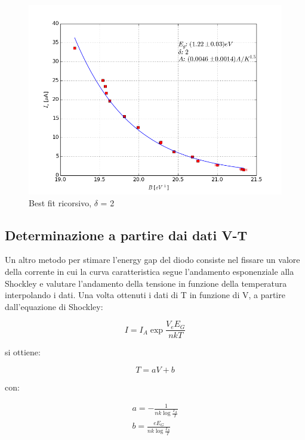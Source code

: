 \documentclass[a4paper]{article}
\begin{document}
\begin{itemize}
\begin{figure}[!h]
\centering
        \includegraphics[scale=.5]{energygap_first_recursive2}
        \caption{Best fit ricorsivo, $\delta$ = 2}
        \label{fig:mouse}
\end{figure}

\subsection{Determinazione a partire dai dati V-T}

Un altro metodo per stimare l'energy gap del diodo consiste nel fissare un valore della corrente in cui la curva caratteristica segue l'andamento esponenziale alla Shockley e valutare l'andamento della tensione in funzione della temperatura interpolando i dati. Una volta ottenuti i dati di T in funzione di V, a partire dall'equazione di Shockley:

\begin{equation}
I = I_A \exp \frac{V_eE_G}{nkT}
\end{equation}

si ottiene:

\begin{equation}
\label{eqn:lin}
T = aV +b
\end{equation}

con:

\begin{gather}
a = -\frac{1}{nk \log \frac{I_A}{I}} \\
b = \frac{eE_G}{nk \log \frac{I_A}{I}}
\end{gather}


\end{itemize}
\end{document}
